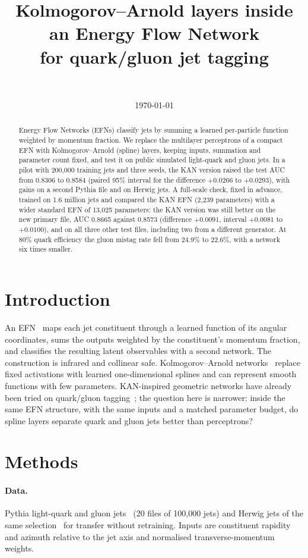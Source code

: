 \documentclass[11pt]{article}
\title{Kolmogorov--Arnold layers inside an Energy Flow Network\\ for quark/gluon jet tagging}
\author{\authorname\\ \small \affiliation}
\date{\today}
\begin{document}
\maketitle

\begin{abstract}
Energy Flow Networks (EFNs) classify jets by summing a learned per-particle function weighted by momentum fraction.
We replace the multilayer perceptrons of a compact EFN with Kolmogorov--Arnold (spline) layers, keeping inputs,
summation and parameter count fixed, and test it on public simulated light-quark and gluon jets. In a pilot with
200,000 training jets and three seeds, the KAN version raised the test AUC from 0.8306 to 0.8584 (paired 95\% interval
for the difference $+0.0266$ to $+0.0293$), with gains on a second Pythia file and on Herwig jets. A full-scale check,
fixed in advance, trained on 1.6 million jets and compared the KAN EFN (2,239 parameters) with a wider standard EFN of
13,025 parameters: the KAN version was still better on the new primary file, AUC 0.8665 against 0.8573 (difference
$+0.0091$, interval $+0.0081$ to $+0.0100$), and on all three other test files, including two from a different
generator. At 80\% quark efficiency the gluon mistag rate fell from 24.9\% to 22.6\%, with a network six times
smaller.
\end{abstract}

\section{Introduction}
An EFN~\cite{efn} maps each jet constituent through a learned function of its angular coordinates, sums the outputs
weighted by the constituent's momentum fraction, and classifies the resulting latent observables with a second
network. The construction is infrared and collinear safe. Kolmogorov--Arnold networks~\cite{kan} replace fixed
activations with learned one-dimensional splines and can represent smooth functions with few parameters. KAN-inspired
geometric networks have already been tried on quark/gluon tagging~\cite{gkan}; the question here is narrower: inside
the same EFN structure, with the same inputs and a matched parameter budget, do spline layers separate quark and
gluon jets better than perceptrons?

\section{Methods}
\paragraph{Data.} Pythia light-quark and gluon jets~\cite{pythiadata} (20 files of 100,000 jets) and Herwig jets of
the same selection~\cite{herwigdata} for transfer without retraining. Inputs are constituent rapidity and azimuth
relative to the jet axis and normalised transverse-momentum weights.
\end{document}
